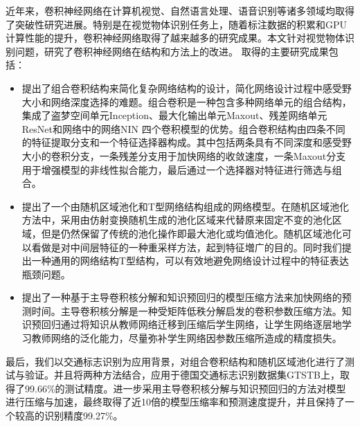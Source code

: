 \begin{cabstract}
  
 近年来，卷积神经网络在计算机视觉、自然语言处理、语音识别等诸多领域均取得了突破性研究进展。特别是在视觉物体识别任务上，随着标注数据的积累和GPU计算性能的提升，卷积神经网络取得了越来越多的研究成果。本文针对视觉物体识别问题，研究了卷积神经网络在结构和方法上的改进。 取得的主要研究成果包括：
  
  \begin{itemize}
    \item 提出了组合卷积结构来简化复杂网络结构的设计，简化网络设计过程中感受野大小和网络深度选择的难题。组合卷积是一种包含多种网络单元的组合结构，集成了盗梦空间单元Inception、最大化输出单元Maxout、残差网络单元ResNet和网络中的网络NIN 四个卷积模型的优势。组合卷积结构由四条不同的特征提取分支和一个特征选择器构成。其中包括两条具有不同深度和感受野大小的卷积分支，一条残差分支用于加快网络的收敛速度，一条Maxout分支用于增强模型的非线性拟合能力，最后通过一个选择器对特征进行筛选与组合。
    \item 提出了一个由随机区域池化和T型网络结构组成的网络模型。在随机区域池化方法中，采用由仿射变换随机生成的池化区域来代替原来固定不变的池化区域，但是仍然保留了传统的池化操作即最大池化或均值池化。随机区域池化可以看做是对中间层特征的一种重采样方法，起到特征増广的目的。同时我们提出一种通用的网络结构T型结构，可以有效地避免网络设计过程中的特征表达瓶颈问题。
    \item 提出了一种基于主导卷积核分解和知识预回归的模型压缩方法来加快网络的预测时间。主导卷积核分解是一种受矩阵低秩分解启发的卷积参数压缩方法。知识预回归通过将知识从教师网络迁移到压缩后学生网络，让学生网络逐层地学习教师网络的泛化能力，尽量弥补学生网络因参数压缩所造成的精度损失。
   \end{itemize}

 最后，我们以交通标志识别为应用背景，对组合卷积结构和随机区域池化进行了测试与验证。并且将两种方法结合，应用于德国交通标志识别数据集GTSTB上，取得了99.66\%的测试精度。进一步采用主导卷积核分解与知识预回归的方法对模型进行压缩与加速，最终取得了近10倍的模型压缩率和预测速度提升，并且保持了一个较高的识别精度99.27\%。
 
 \end{cabstract}


